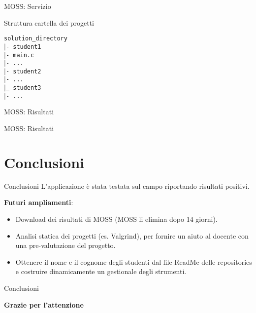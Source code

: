 \documentclass{beamer}
\newcommand\tab[1][1cm]{\hspace*{#1}}	%
\begin{document}
	\begin{frame}{MOSS: Servizio}
		\begin{block}{Struttura cartella dei progetti}
		 	\begin{tcolorbox}
				\texttt{\tab solution\_directory\\ 
					\tab $\vert$- student1\\
					\tab[1.5cm] $\vert$- main.c\\
					\tab[1.5cm] $\vert$- ...\\
					\tab $\vert$- student2\\
					\tab[1.5cm] $\vert$- ...\\
					\tab $\vert$\_ student3\\
					\tab[1.5cm] $\vert$- ...
				}
			\end{tcolorbox}
		\end{block}
	\end{frame}
	
	\begin{frame}{MOSS: Risultati}
		\begin{center}
		\end{center}
	\end{frame}

	\begin{frame}{MOSS: Risultati}
		\begin{center}
		\end{center}
	\end{frame}
	\section{Conclusioni}

	
	\begin{frame}{Conclusioni}
		L'applicazione è stata testata sul campo riportando risultati positivi.
		
		\vspace{0.5cm}
		\textbf{Futuri ampliamenti}:
		\begin{itemize}
			\item Download dei risultati di MOSS (MOSS li elimina dopo 14 giorni).
			\item Analisi statica dei progetti (es. Valgrind), per fornire un aiuto al docente con una pre-valutazione del progetto.
			\item Ottenere il nome e il cognome degli studenti dal file ReadMe delle repositories e costruire dinamicamente un gestionale degli strumenti.
		\end{itemize}
	\end{frame}

	\begin{frame}{Conclusioni}
		\begin{center}
			{\Huge \textcolor{rossoPantano}{\textbf{Grazie per l'attenzione}}}
		\end{center}
		
	\end{frame}
\end{document}
